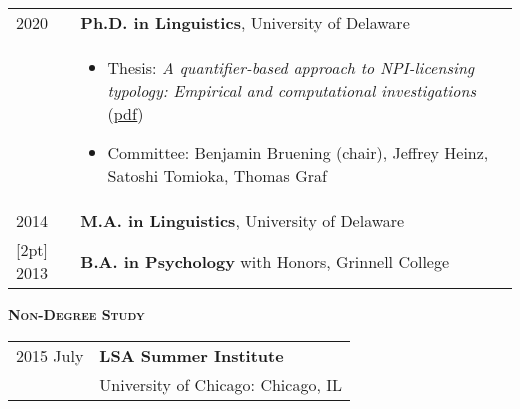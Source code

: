 \documentclass[11pt]{article} %
\begin{document}
\begin{tabular}{p{0.75in} p{5.5in}}
2020 & {\bf Ph.D. in Linguistics}, University of Delaware \\
& \begin{itemize}
 \item {Thesis: \textit{A quantifier-based approach to NPI-licensing typology: Empirical and computational investigations}} (\href{https://maihavu.com/dissertation/vu-dissertation-2020-04-16.pdf}{pdf})
 \item Committee: Benjamin Bruening (chair), Jeffrey Heinz, Satoshi Tomioka, Thomas Graf
 \end{itemize} \\ %
[2pt]
2014 & \textbf{M.A. in Linguistics}, University of Delaware \\ 
 [2pt]
2013 & \textbf{B.A. in Psychology} with Honors, Grinnell College \\
\end{tabular}
\vspace{5pt}

\textsc{\textbf{Non-Degree Study}}

\vspace{5pt}

\begin{tabular}{p{0.75in} l}
2015 July & \textbf{LSA Summer Institute} \\
	& University of Chicago: Chicago, IL \\ 
\end{tabular}
\renewcommand{\refname}{Presentations}

 \makeatletter 
\renewcommand\BR@b@bibitem[2][]{\BR@bibitem[#1]{#2}\BR@c@bibitem{#2}}           
\makeatother
\end{document}
